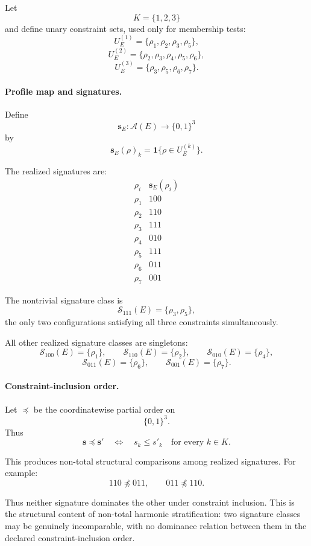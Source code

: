 \documentclass[aps,prx,onecolumn,11pt]{revtex4-2}
\theoremstyle{plain}
\theoremstyle{definition}
\theoremstyle{remark}
\begin{document}
Let
\[
K=\{1,2,3\}
\]
and define unary constraint sets, used only for membership tests:
\[
U^{(1)}_E
=
\{\rho_1,\rho_2,\rho_3,\rho_5\},
\]
\[
U^{(2)}_E
=
\{\rho_2,\rho_3,\rho_4,\rho_5,\rho_6\},
\]
\[
U^{(3)}_E
=
\{\rho_3,\rho_5,\rho_6,\rho_7\}.
\]

\paragraph{Profile map and signatures.}

Define
\[
\mathbf s_E:\mathcal A(E)\to\{0,1\}^3
\]
by
\[
\mathbf s_E(\rho)_k
=
\mathbf 1\{\rho\in U^{(k)}_E\}.
\]

The realized signatures are:
\[
\begin{array}{c|c}
\rho_i & \mathbf s_E(\rho_i) \\ \hline
\rho_1 & 100 \\
\rho_2 & 110 \\
\rho_3 & 111 \\
\rho_4 & 010 \\
\rho_5 & 111 \\
\rho_6 & 011 \\
\rho_7 & 001
\end{array}
\]

The nontrivial signature class is
\[
\mathcal S_{111}(E)
=
\{\rho_3,\rho_5\},
\]
the only two configurations satisfying all three constraints
simultaneously.

All other realized signature classes are singletons:
\[
\mathcal S_{100}(E)=\{\rho_1\},
\qquad
\mathcal S_{110}(E)=\{\rho_2\},
\qquad
\mathcal S_{010}(E)=\{\rho_4\},
\]
\[
\mathcal S_{011}(E)=\{\rho_6\},
\qquad
\mathcal S_{001}(E)=\{\rho_7\}.
\]

\paragraph{Constraint-inclusion order.}

Let \(\preceq\) be the coordinatewise partial order on
\[
\{0,1\}^3.
\]
Thus
\[
\mathbf s\preceq\mathbf s'
\quad\Longleftrightarrow\quad
s_k\leq s'_k
\quad
\text{for every }k\in K.
\]

This produces non-total structural comparisons among realized
signatures. For example:
\[
110\not\preceq 011,
\qquad
011\not\preceq 110.
\]

Thus neither signature dominates the other under constraint inclusion.
This is the structural content of non-total harmonic stratification:
two signature classes may be genuinely incomparable, with no dominance
relation between them in the declared constraint-inclusion order.
\end{document}
